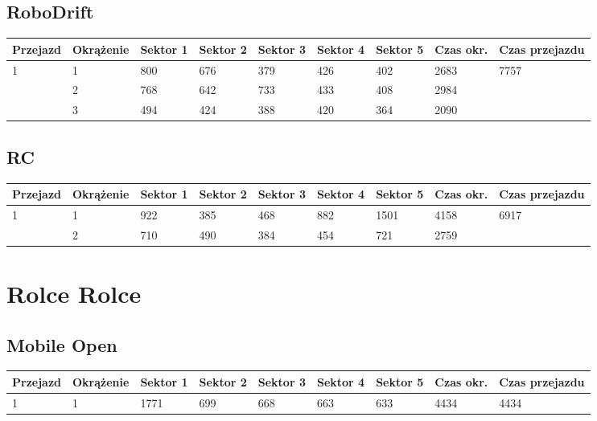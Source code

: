 \documentclass[11pt]{article}
\begin{document}
\subsection{RoboDrift}
\begin{table}[h]
\begin{tabular}{|l|l|l|l|l|l|l|l|l|}
\hline
   Przejazd        & Okrążenie & Sektor 1 & Sektor 2 & Sektor 3 & Sektor 4 & Sektor 5 & Czas okr. & Czas przejazdu    \\ \hline
\multirow{3}{*}{1}& 1 &800& 676& 379& 426& 402& 2683& \multirow{3}{*}{7757} \\ \cline{2-8}
& 2& 768& 642& 733& 433& 408& 2984& \\ \cline{2-8}
& 3& 494& 424& 388& 420& 364& 2090& \\ \hline
\end{tabular}
\end{table}
\subsection{RC}
\begin{table}[h]
\begin{tabular}{|l|l|l|l|l|l|l|l|l|}
\hline
 Przejazd        & Okrążenie & Sektor 1 & Sektor 2 & Sektor 3 & Sektor 4 & Sektor 5 & Czas okr. & Czas przejazdu    \\ \hline
\multirow{2}{*}{1}& 1 &922& 385& 468& 882& 1501& 4158& \multirow{2}{*}{6917} \\ \cline{2-8}
& 2& 710& 490& 384& 454& 721& 2759& \\ \hline
\end{tabular}
\end{table}
\pagebreak
\section{Rolce Rolce}
\subsection{Mobile Open}
\begin{table}[h]
\begin{tabular}{|l|l|l|l|l|l|l|l|l|}
\hline
   Przejazd        & Okrążenie & Sektor 1 & Sektor 2 & Sektor 3 & Sektor 4 & Sektor 5 & Czas okr. & Czas przejazdu    \\ \hline
\multirow{1}{*}{1}& 1 &1771& 699& 668& 663& 633& 4434& 4434\\ \hline
\end{tabular}
\end{table}
\end{document}
